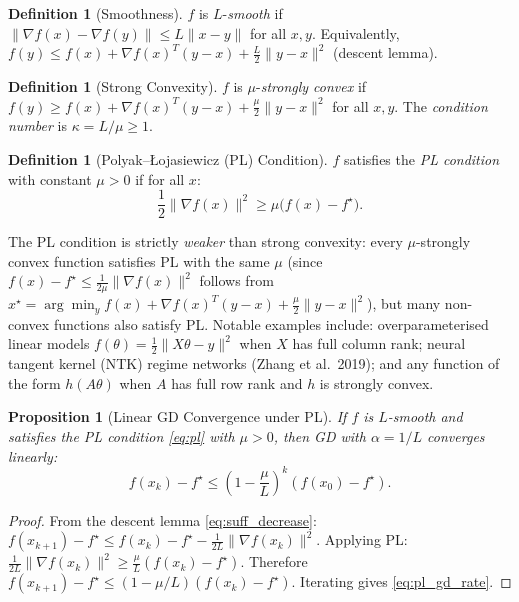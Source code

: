 \documentclass[11pt,a4paper]{article}
\newtheorem{proposition}[theorem]{Proposition}
\theoremstyle{definition}
\newtheorem{definition}[theorem]{Definition}
\begin{document}
\begin{definition}[Smoothness]
$f$ is $L$-\emph{smooth} if $\|\nabla f(x) - \nabla f(y)\| \leq L\|x-y\|$ for all $x,y$. Equivalently, $f(y) \leq f(x) + \nabla f(x)^T(y-x) + \tfrac{L}{2}\|y-x\|^2$ (descent lemma).
\end{definition}

\begin{definition}[Strong Convexity]
$f$ is $\mu$-\emph{strongly convex} if $f(y) \geq f(x) + \nabla f(x)^T(y-x) + \frac{\mu}{2}\|y-x\|^2$ for all $x,y$. The \emph{condition number} is $\kappa = L/\mu \geq 1$.
\end{definition}

\begin{definition}[Polyak--\L ojasiewicz (PL) Condition]
\label{def:pl}
$f$ satisfies the \emph{PL condition} with constant $\mu > 0$ if for all $x$:
\begin{equation}
\frac{1}{2}\|\nabla f(x)\|^2 \geq \mu\bigl(f(x) - f^{\star}\bigr).
\label{eq:pl}
\end{equation}
\end{definition}

The PL condition is strictly \emph{weaker} than strong convexity: every $\mu$-strongly convex function satisfies PL with the same $\mu$ (since $f(x) - f^{\star} \leq \frac{1}{2\mu}\|\nabla f(x)\|^2$ follows from $x^{\star} = \arg\min_y f(x) + \nabla f(x)^T(y-x) + \frac{\mu}{2}\|y-x\|^2$), but many non-convex functions also satisfy PL. Notable examples include: overparameterised linear models $f(\theta) = \frac{1}{2}\|X\theta - y\|^2$ when $X$ has full column rank; neural tangent kernel (NTK) regime networks (Zhang et al.\ 2019); and any function of the form $h(A\theta)$ when $A$ has full row rank and $h$ is strongly convex.

\begin{proposition}[Linear GD Convergence under PL]
\label{prop:pl_gd}
If $f$ is $L$-smooth and satisfies the PL condition \eqref{eq:pl} with $\mu > 0$, then GD with $\alpha = 1/L$ converges linearly:
\begin{equation}
f(x_k) - f^{\star} \leq \left(1 - \frac{\mu}{L}\right)^k (f(x_0) - f^{\star}).
\label{eq:pl_gd_rate}
\end{equation}
\end{proposition}

\begin{proof}
From the descent lemma \eqref{eq:suff_decrease}: $f(x_{k+1}) - f^{\star} \leq f(x_k) - f^{\star} - \frac{1}{2L}\|\nabla f(x_k)\|^2$. Applying PL: $\frac{1}{2L}\|\nabla f(x_k)\|^2 \geq \frac{\mu}{L}(f(x_k) - f^{\star})$. Therefore $f(x_{k+1}) - f^{\star} \leq (1 - \mu/L)(f(x_k) - f^{\star})$. Iterating gives \eqref{eq:pl_gd_rate}.
\end{proof}
\end{document}
